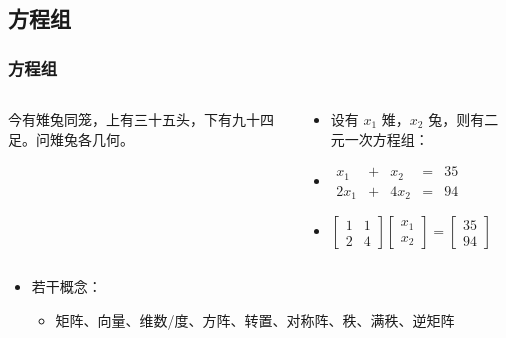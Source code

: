 \documentclass[serif,aspectratio=169]{beamer}
\begin{document}
\subsection{方程组}
\begin{frame}
  \frametitle{方程组}
  \begin{columns}
    \begin{column}{.4\textwidth}
      今有雉兔同笼，上有三十五头，下有九十四足。问雉兔各几何。

    \end{column}
    \begin{column}{.6\textwidth}
      \begin{itemize}
      \item 设有 $x_1$ 雉，$x_2$ 兔，则有二元一次方程组：
      \item[] $\displaystyle\begin{array}{rcrcc}
        x_1  & + &  x_2 & = & 35\\
        2x_1 & + & 4x_2 & = & 94\end{array}$
        
        \pause
      \item[] $\displaystyle\left[\begin{array}{cc}
          1&1\\
          2&4
        \end{array}\right]
        \left[\begin{array}{c}
            x_1\\
            x_2
          \end{array}\right]=
        \left[\begin{array}{c}
            35\\
            94
          \end{array}\right]$
      \end{itemize}
    \end{column}
  \end{columns}
  \begin{itemize}
    
    \pause
    \vspace{2ex}
    
  \item 若干概念：
    \begin{itemize}
    \item 矩阵、向量、维数/度、方阵、转置、对称阵、秩、满秩、逆矩阵

      \vspace{1ex}
      

\end{itemize}
\end{itemize}
\end{frame}
\end{document}
